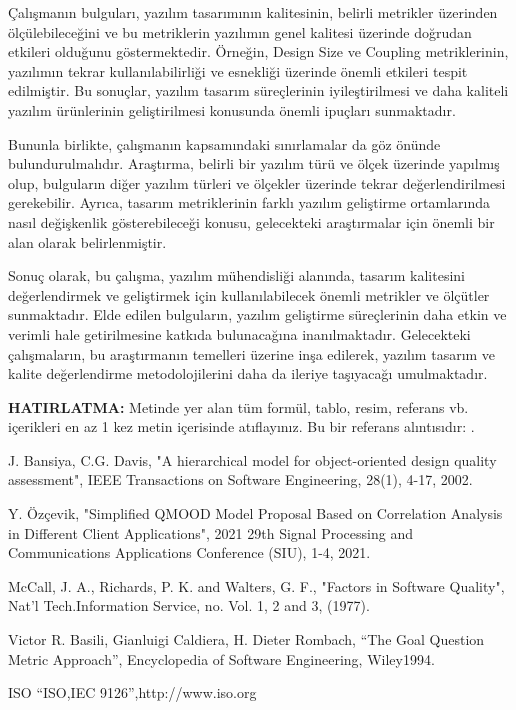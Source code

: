 \documentclass[conference]{IEEEtran}
\begin{document}
Çalışmanın bulguları, yazılım tasarımının kalitesinin, belirli metrikler üzerinden ölçülebileceğini ve bu metriklerin yazılımın genel kalitesi üzerinde doğrudan etkileri olduğunu göstermektedir. Örneğin, Design Size ve Coupling metriklerinin, yazılımın tekrar kullanılabilirliği ve esnekliği üzerinde önemli etkileri tespit edilmiştir. Bu sonuçlar, yazılım tasarım süreçlerinin iyileştirilmesi ve daha kaliteli yazılım ürünlerinin geliştirilmesi konusunda önemli ipuçları sunmaktadır.

Bununla birlikte, çalışmanın kapsamındaki sınırlamalar da göz önünde bulundurulmalıdır. Araştırma, belirli bir yazılım türü ve ölçek üzerinde yapılmış olup, bulguların diğer yazılım türleri ve ölçekler üzerinde tekrar değerlendirilmesi gerekebilir. Ayrıca, tasarım metriklerinin farklı yazılım geliştirme ortamlarında nasıl değişkenlik gösterebileceği konusu, gelecekteki araştırmalar için önemli bir alan olarak belirlenmiştir.

Sonuç olarak, bu çalışma, yazılım mühendisliği alanında, tasarım kalitesini değerlendirmek ve geliştirmek için kullanılabilecek önemli metrikler ve ölçütler sunmaktadır. Elde edilen bulguların, yazılım geliştirme süreçlerinin daha etkin ve verimli hale getirilmesine katkıda bulunacağına inanılmaktadır. Gelecekteki çalışmaların, bu araştırmanın temelleri üzerine inşa edilerek, yazılım tasarım ve kalite değerlendirme metodolojilerini daha da ileriye taşıyacağı umulmaktadır.

\textbf{HATIRLATMA:} Metinde yer alan tüm formül, tablo, resim, referans vb. içerikleri en az 1 kez metin içerisinde atıflayınız.
Bu bir referans alıntısıdır: \cite{label}.

\begin{thebibliography}{1}
	
	J. Bansiya, C.G. Davis, "A hierarchical model for object-oriented design quality assessment", IEEE Transactions on Software Engineering, 28(1), 4-17, 2002.
	
	Y. Özçevik, "Simplified QMOOD Model Proposal Based on Correlation Analysis in Different Client Applications", 2021 29th Signal Processing and Communications Applications Conference (SIU), 1-4, 2021.
	
	McCall, J. A., Richards, P. K. and Walters, G. F., "Factors in Software Quality", Nat’l Tech.Information Service, no. Vol. 1, 2 and 3, (1977).
	
	Victor R. Basili, Gianluigi Caldiera, H. Dieter Rombach, “The Goal Question Metric Approach”, Encyclopedia of Software Engineering, Wiley1994.
	
	ISO “ISO,IEC 9126”,http://www.iso.org
	
\end{thebibliography}
\end{document}
